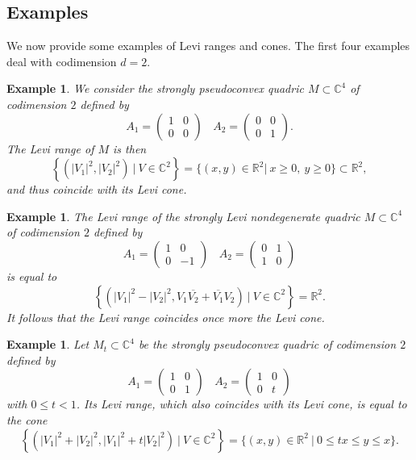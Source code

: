 \documentclass[10pt,a4paper]{amsart}
\newcommand{\C}{\mathbb C}
\newcommand{\R}{\mathbb R}
\newtheorem{example}[theo]{Example}
\numberwithin{equation}{section}
\begin{document}
\subsection{Examples}

We now provide some examples of Levi ranges and cones. The first four examples deal with codimension $d=2$.		
	
\begin{example}\label{excorner}
We consider the strongly pseudoconvex quadric $M\subset \C^4$ of codimension $2$ defined by   
$$A_1=
\begin{pmatrix}
	1& 0 \\ 0 &0 
\end{pmatrix} \ \ \ \ A_2=
\begin{pmatrix}
	0& 0 \\ 0 &1 
\end{pmatrix}.$$
The Levi range of $M$ is then
 $$\left\{\left(|V_1|^2,|V_2|^2\right) \ | \ V\in \C^2 \right\}=\{(x,y) \in \R^2 |  \ x\geq 0, \ y\geq 0\}\subset \R^2,$$
 and thus coincide with its Levi cone.
\end{example}  


\begin{example}\label{ex2pi}
 The Levi range of the strongly Levi nondegenerate quadric $M\subset \C^4$ of codimension $2$ defined by   
$$A_1=
\begin{pmatrix}
	1& 0 \\ 0 &-1 
\end{pmatrix} \ \ \ \ A_2=
\begin{pmatrix}
	0& 1 \\ 1 &0 
\end{pmatrix}$$
is equal to
$$\left\{\left(|V_1|^2-|V_2|^2,V_1\overline{V_2}+\overline{V_1}V_2\right) \ | \ V\in \C^2 \right\}=\R^2.$$
It follows that the Levi range coincides once more the  Levi cone.
\end{example}      


\begin{example}\label{exconet} Let $M_t\subset \C^4$ be the strongly pseudoconvex quadric of codimension $2$ defined by   
$$A_1=
\begin{pmatrix}
	1& 0 \\ 0 &1 
\end{pmatrix} \ \ \ \ A_2=
\begin{pmatrix}
	1& 0 \\ 0 & t
\end{pmatrix}$$
with $0\leq t<1$.  Its Levi range, which also coincides with its Levi cone, is equal to the cone 
$$\left\{\left(|V_1|^2+|V_2|^2,|V_1|^2+t|V_2|^2\right) \ | \ V\in \C^2 \right\}=\{(x,y) \in \R^2 \ | \  0 \leq t x \leq  y \leq x\}.$$
\end{example}      
\end{document}

